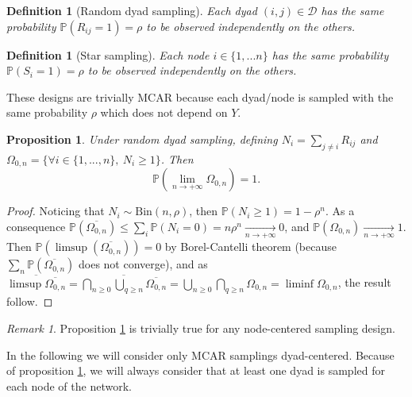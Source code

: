\documentclass[]{imsart}
\newcommand{\1}{\mathds{1}}
\newcommand{\dyad}{\mathcal{D}}
\newcommand{\Pbb}{\mathbb{P}}
\numberwithin{equation}{section}
\theoremstyle{plain}
\newtheorem{dof}[thm]{Definition}
\newtheorem{proposition}[thm]{Proposition}
\theoremstyle{remark}
\newtheorem{rem}[thm]{Remark}
\begin{document}
\begin{dof}[Random dyad sampling]
  Each   dyad    $(i,j)   \in\dyad$    has   the    same   probability
  $\Pbb(R_{ij}=1)=\rho$ to be observed independently on the others.
\end{dof}
\begin{dof}[Star sampling]
  Each   node    $i   \in \{1,...n\}$    has   the    same   probability
  $\Pbb(S_{i}=1)=\rho$ to be observed independently on the others.
\end{dof}
These designs  are trivially MCAR because  each dyad/node is sampled  with the
same probability $\rho$ which does not depend on $Y$. \\

\begin{proposition}
Under random dyad sampling, defining $N_i = \sum_{j \neq i}R_{ij}$ and $\Omega_{0,n} = \{ \forall i \in \{ 1, ..., n \}, \ N_i \geqslant 1 \}$. Then 
$$\mathbb{P}\left(\underset{n\to+\infty}{\lim}\Omega_{0,n}\right) = 1.$$
\label{prop:Omega}
\end{proposition}
\begin{proof}
Noticing that $N_i \sim \text{Bin}(n, \rho)$, then  $\mathbb{P}(N_i \geqslant 1) = 1 - {\rho}^n$. As a consequence
$\mathbb{P}(\overline{\Omega_{0,n}}) \leqslant  \sum_{i} \mathbb{P}(N_i = 0) = n\rho^n \underset{n\to+\infty}{\longrightarrow} 0$, and 
$\mathbb{P}(\Omega_{0,n}) \underset{n\to+\infty}{\longrightarrow} 1$. Then
$\mathbb{P}(\limsup (\overline{\Omega_{0,n}})) = 0$ by Borel-Cantelli theorem (because $\sum_{n} \mathbb{P}(\overline{\Omega_{0,n}})$ does not converge), and as
$\overline{\limsup \overline{\Omega_{0,n}}} = \overline{\bigcap_{n \geqslant 0} \bigcup_{q \geqslant n} \overline{\Omega_{0,n}}} = \bigcup_{n \geqslant 0} \bigcap_{q \geqslant n} {\Omega_{0,n}} =
\liminf {\Omega_{0,n}}$, the result follow.
\end{proof}

\begin{rem}
Proposition \ref{prop:Omega} is trivially true for any node-centered sampling design.
\end{rem}

In the following we will consider only MCAR samplings dyad-centered. Because of proposition \ref{prop:Omega}, we will always consider that at least one dyad is sampled for each node of the network.
\end{document}
